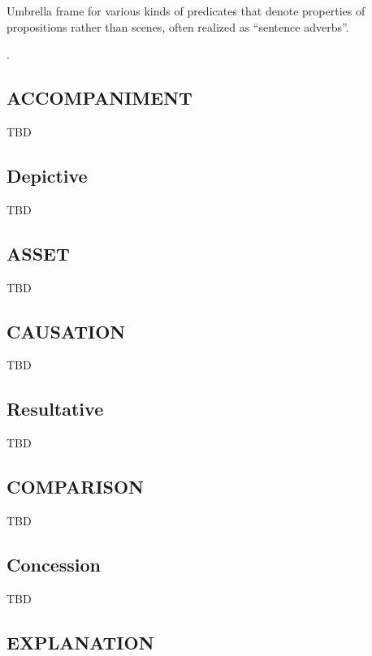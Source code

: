 \documentclass[a4paper]{article}
\newcommand{\fr}[1]{\textsf{#1}}
\begin{document}
Umbrella frame for various kinds of predicates that denote properties of propositions rather than scenes, often realized as ``sentence adverbs''.

\ex.

\subsection{\fr{ACCOMPANIMENT}}
\label{sec:ACCOMPANIMENT}

TBD

\subsection{\fr{Depictive}}
\label{sec:Depictive}

TBD

\subsection{\fr{ASSET}}
\label{sec:ASSET}

TBD

\subsection{\fr{CAUSATION}}
\label{sec:CAUSATION}

TBD

\subsection{\fr{Resultative}}
\label{sec:Resultative}

TBD

\subsection{\fr{COMPARISON}}
\label{sec:COMPARISON}

TBD

\subsection{\fr{Concession}}
\label{sec:Concession}

TBD

\subsection{\fr{EXPLANATION}}
\label{sec:EXPLANATION}
\end{document}
